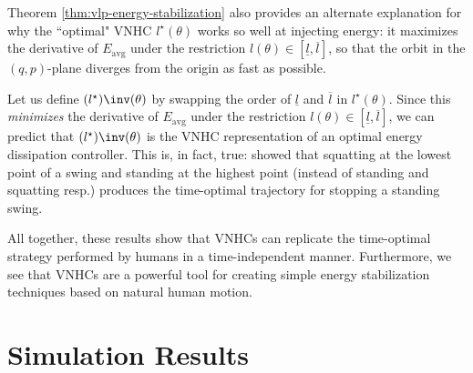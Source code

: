 \begin{figure}
   \centering
   \caption{}\label{fig:vlp-energy-in-out}
\end{figure}

Theorem \ref{thm:vlp-energy-stabilization} also provides an alternate
explanation for why the ``optimal" VNHC \(l^\star(\theta)\) works so well at
injecting energy: it maximizes the derivative of \(E_\text{avg}\) under the
restriction \(l(\theta) \in [\underline{l},\overline{l}]\), so that the orbit in the
\((q,p)\)-plane diverges from the origin as fast as possible. 

Let us define \((l^\star)\inv(\theta)\) by swapping the order of 
\(\underline{l}\) and \(\overline{l}\) in \(l^\star(\theta)\). Since this 
\textit{minimizes} the derivative of \(E_\text{avg}\) under the restriction
\(l(\theta) \in [\underline{l},\overline{l}]\), we can predict that 
\((l^\star)\inv(\theta)\) is the VNHC representation of an optimal 
energy dissipation controller.
This is, in fact, true: \cite{pumping_swing_standing_squatting} showed 
that squatting at the lowest point of a swing and standing at the highest
point (instead of standing and squatting resp.) produces the
time-optimal trajectory for stopping a standing swing. 

All together, these results show that VNHCs can replicate the time-optimal
strategy performed by humans in a time-independent manner. Furthermore, we see
that VNHCs are a powerful tool for creating simple energy stabilization
techniques based on natural human motion.

\section{Simulation Results}

